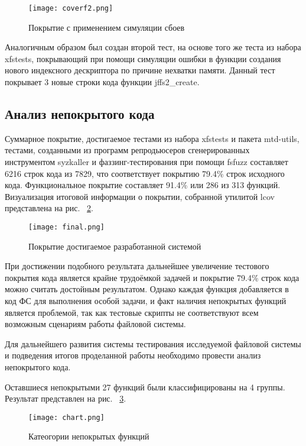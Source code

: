 \begin{figure}[H]
	\centering
	\texttt{[image: coverf2.png]}
	\caption{Покрытие с применением симуляции сбоев}
	\label{coverf2}
\end{figure}

Аналогичным образом был создан второй тест, на основе того же теста из набора xfstests, покрывающий при помощи симуляции ошибки в функции создания нового индексного дескриптора по причине нехватки памяти. Данный тест покрывает 3 новые строки кода функции jffs2\_create.

\subsection{Анализ непокрытого кода}

Суммарное покрытие, достигаемое тестами из набора xfstests и пакета mtd-utils, тестами, созданными из программ репродьюсеров сгенерированных инструментом syzkaller и фаззинг-тестирования при помощи fsfuzz составляет 6216 строк кода из 7829, что соответствует покрытию 79.4\% строк исходного кода. Функциональное покрытие составляет 91.4\% или 286 из 313 функций. Визуализация итоговой информации о покрытии, собранной утилитой lcov представлена на рис. ~\ref{final}.

\begin{figure}[H]
	\centering
	\texttt{[image: final.png]}
	\caption{Покрытие достигаемое разработанной системой}
	\label{final}
\end{figure}

При достижении подобного результата дальнейшее увеличение тестового покрытия кода является крайне трудоёмкой задачей и покрытие 79.4\% строк кода можно считать достойным результатом. Однако каждая функция добавляется в код ФС для выполнения особой задачи, и факт наличия непокрытых функций является проблемой, так как тестовые скрипты не соответствуют всем возможным сценариям работы файловой системы.

Для дальнейшего развития системы тестирования исследуемой файловой системы и подведения итогов проделанной работы необходимо провести анализ непокрытого кода.

Оставшиеся непокрытыми 27 функций были классифицированы на 4 группы. Результат представлен на рис. ~\ref{funcs}.

\begin{figure}[H]
	\centering
	\texttt{[image: chart.png]}
	\caption{Катеогории непокрытых функций}
	\label{funcs}
\end{figure}

